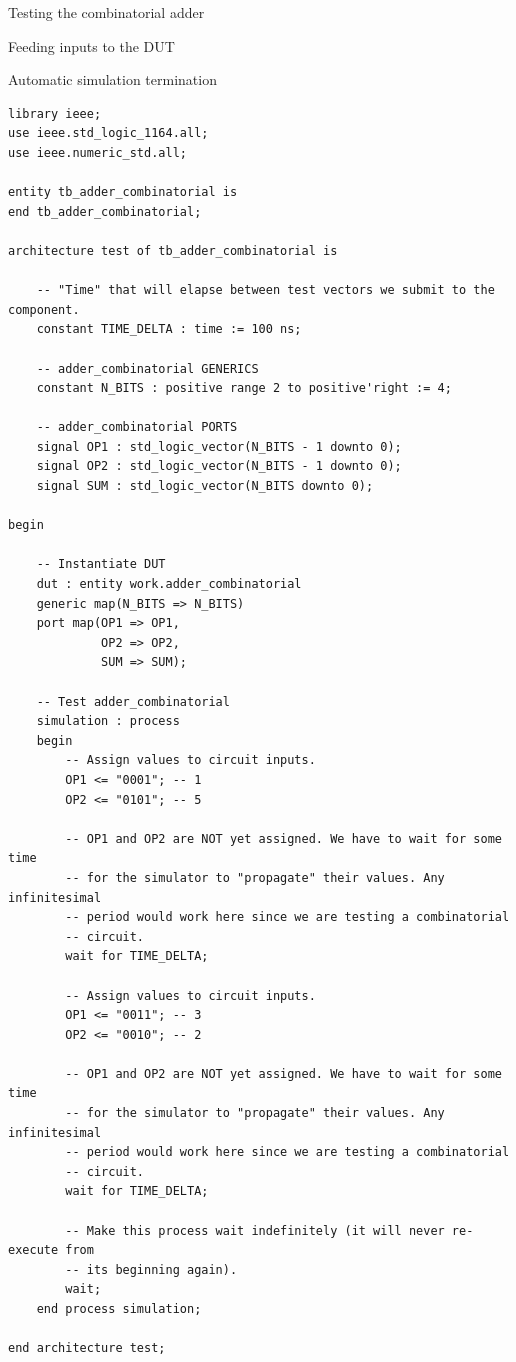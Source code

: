 \documentclass[lab]{course}
\begin{document}
\begin{section}{Testing the combinatorial adder}
\begin{subsection}{Feeding inputs to the DUT}
\begin{subsubsection}{Automatic simulation termination}
            \begin{lstlisting}[caption={Indefinite \texttt{wait} statement added to simulation process}, captionpos=b, label={lst:combinatorial_indefinite_wait_statement_added_to_simulation_process}]
library ieee;
use ieee.std_logic_1164.all;
use ieee.numeric_std.all;

entity tb_adder_combinatorial is
end tb_adder_combinatorial;

architecture test of tb_adder_combinatorial is

    -- "Time" that will elapse between test vectors we submit to the component.
    constant TIME_DELTA : time := 100 ns;

    -- adder_combinatorial GENERICS
    constant N_BITS : positive range 2 to positive'right := 4;

    -- adder_combinatorial PORTS
    signal OP1 : std_logic_vector(N_BITS - 1 downto 0);
    signal OP2 : std_logic_vector(N_BITS - 1 downto 0);
    signal SUM : std_logic_vector(N_BITS downto 0);

begin

    -- Instantiate DUT
    dut : entity work.adder_combinatorial
    generic map(N_BITS => N_BITS)
    port map(OP1 => OP1,
             OP2 => OP2,
             SUM => SUM);

    -- Test adder_combinatorial
    simulation : process
    begin
        -- Assign values to circuit inputs.
        OP1 <= "0001"; -- 1
        OP2 <= "0101"; -- 5

        -- OP1 and OP2 are NOT yet assigned. We have to wait for some time
        -- for the simulator to "propagate" their values. Any infinitesimal
        -- period would work here since we are testing a combinatorial
        -- circuit.
        wait for TIME_DELTA;

        -- Assign values to circuit inputs.
        OP1 <= "0011"; -- 3
        OP2 <= "0010"; -- 2

        -- OP1 and OP2 are NOT yet assigned. We have to wait for some time
        -- for the simulator to "propagate" their values. Any infinitesimal
        -- period would work here since we are testing a combinatorial
        -- circuit.
        wait for TIME_DELTA;

        -- Make this process wait indefinitely (it will never re-execute from
        -- its beginning again).
        wait;
    end process simulation;

end architecture test;
            \end{lstlisting}


\end{subsubsection}
\end{subsection}
\end{section}
\end{document}
